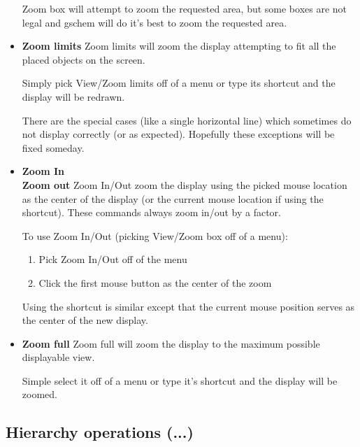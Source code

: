 \documentclass{article}
\begin{document}
\begin{itemize}
Zoom box will attempt to zoom the requested area, but some boxes are
not legal and gschem will do it's best to zoom the requested area.

\item {\bf Zoom limits} Zoom limits will zoom the display attempting
  to fit all the placed objects on the screen.
  
  Simply pick View/Zoom limits off of a menu or type its shortcut and
  the display will be redrawn.
  
  There are the special cases (like a single horizontal line) which
  sometimes do not display correctly (or as expected).  Hopefully
  these exceptions will be fixed someday.
  
\item {\bf Zoom In} \\
  {\bf Zoom out} Zoom In/Out zoom the display using the picked mouse
  location as the center of the display (or the current mouse location
  if using the shortcut).  These commands always zoom in/out by a
  factor.
  
  To use Zoom In/Out (picking View/Zoom box off of a menu):
\begin{enumerate}
\item Pick Zoom In/Out off of the menu
\item Click the first mouse button as the center of the zoom
\end{enumerate}        
Using the shortcut is similar except that the current mouse position
serves as the center of the new display.

\item {\bf Zoom full} Zoom full will zoom the display to the maximum
  possible displayable view.
  
  Simple select it off of a menu or type it's shortcut and the display
  will be zoomed.

\end{itemize}

\subsection{Hierarchy operations (...)}
\end{document}
